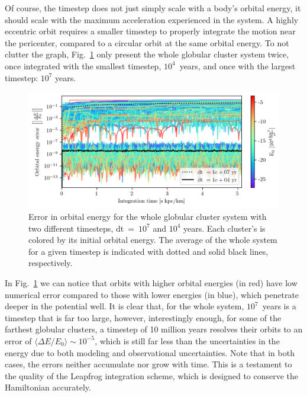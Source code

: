         Of course, the timestep does not just simply scale with a body's orbital energy, it should scale with the maximum acceleration experienced in the system. A highly eccentric orbit requires a smaller timestep to properly integrate the motion near the pericenter, compared to a circular orbit at the same orbital energy. To not clutter the graph, Fig.~\ref{fig:numericalErrorLeapfrogVanilla} only present the whole globular cluster system twice, once integrated with the smallest timestep, $10^4$~years, and once with the largest timestep: $10^7$ years.

        \begin{figure}
            \centering
            \includegraphics[width=\linewidth]{images/numericalErrorLeapfrogVanilla.png}
            \caption{Error in orbital energy for the whole globular cluster system with two different timesteps, dt~=~$10^{7}$ and $10^{4}$ years. Each cluster's is colored by its initial orbital energy. The average of the whole system for a given timestep is indicated with dotted and solid black lines, respectively.}
            \label{fig:numericalErrorLeapfrogVanilla}
        \end{figure}
        In Fig.~\ref{fig:numericalErrorLeapfrogVanilla} we can notice that orbits with higher orbital energies (in red) have low numerical error compared to those with lower energies (in blue),  which penetrate deeper in the potential well. It is clear that, for the whole system, $10^7$~years is a timestep that is far too large, however, interestingly enough, for some of the farthest globular clusters, a timestep of 10 million years resolves their orbits to an error of $\langle \Delta E / E_0 \rangle \sim 10^{-5}$, which is still far less than the uncertainties in the energy due to both modeling and observational uncertainties. Note that in both cases, the errors neither accumulate nor grow with time. This is a testament to the quality of the Leapfrog integration scheme, which is designed to conserve the Hamiltonian accurately.

